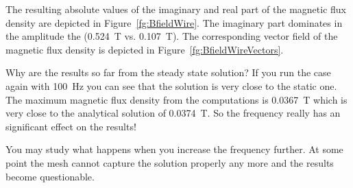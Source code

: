 The resulting absolute values of the imaginary and real part of the magnetic flux density are depicted in
Figure~\ref{fg:BfieldWire}. The imaginary part dominates in the amplitude the (0.524~T vs. 0.107~T). 
The corresponding vector field of the magnetic flux density is depicted in Figure~\ref{fg:BfieldWireVectors}.

Why are the results so far from the steady state solution? If you run the case again with 
100~Hz you can see that the solution is very close to the static one. The maximum magnetic flux density from the
computations is 0.0367~T which is very close to the analytical solution of 0.0374~T. So the frequency
really has an significant effect on the results!

You may study what happens when you increase the frequency further. At some point the mesh cannot capture the solution
properly any more and the results become questionable.


\hfill



